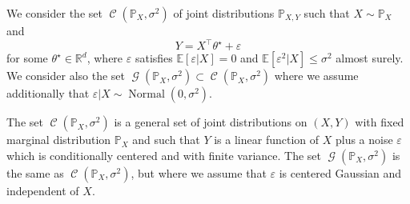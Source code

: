 \documentclass[
	fontsize=11pt, %
	twoside=false, %
	numbers=noenddot, %
]{kaobook}
\DeclareMathOperator{\cC}{{\mathcal C}}
\DeclareMathOperator{\cG}{{\mathcal G}}
\DeclareMathOperator{\nor}{Normal}
\newcommand{\eps}{\varepsilon}
\renewcommand{\P}{\mathbb P}
\newcommand{\E}{\mathbb E}
\newcommand{\R}{\mathbb R}
\begin{document}
\begin{definition}
	We consider the set $\cC(\P_X, \sigma^2)$ of joint distributions $\P_{X, Y}$ such that $X \sim \P_X$ and
	\begin{equation*}
		Y = X^\top \theta^\star + \eps
	\end{equation*}
	for some $ \theta^\star \in \R^d$, where $\eps$ satisfies $\E[\eps | X] = 0$ and $\E[\eps^2 | X] \leq \sigma^2$ almost surely. We consider also the set $\cG(\P_X, \sigma^2) \subset \cC(\P_X, \sigma^2)$ where we assume additionally that $\eps | X \sim \nor(0, \sigma^2)$.
\end{definition}
The set $\cC(\P_X, \sigma^2)$ is a general set of joint distributions on $(X, Y)$ with fixed marginal distribution $\P_X$ and such that $Y$ is a linear function of $X$ plus a noise $\eps$ which is conditionally centered and with finite variance. 
The set $\cG(\P_X, \sigma^2)$ is the same as $\cC(\P_X, \sigma^2)$, but where we assume that $\eps$ is centered Gaussian and independent of $X$.
\end{document}

